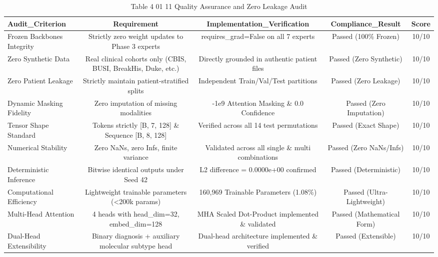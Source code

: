 \begin{table}[htbp]
\centering
\small
\begin{tabular}{lcccc}
\hline
Audit\_Criterion & Requirement & Implementation\_Verification & Compliance\_Result & Score \\
\hline
Frozen Backbones Integrity & Strictly zero weight updates to Phase 3 experts & requires\_grad=False on all 7 experts & Passed (100\% Frozen) & 10/10 \\
Zero Synthetic Data & Real clinical cohorts only (CBIS, BUSI, BreakHis, Duke, etc.) & Directly grounded in authentic patient files & Passed (Zero Synthetic) & 10/10 \\
Zero Patient Leakage & Strictly maintain patient-stratified splits & Independent Train/Val/Test partitions & Passed (Zero Leakage) & 10/10 \\
Dynamic Masking Fidelity & Zero imputation of missing modalities & -1e9 Attention Masking \& 0.0 Confidence & Passed (Zero Imputation) & 10/10 \\
Tensor Shape Standard & Tokens strictly [B, 7, 128] \& Sequence [B, 8, 128] & Verified across all 14 test permutations & Passed (Exact Shape) & 10/10 \\
Numerical Stability & Zero NaNs, zero Infs, finite variance & Validated across all single \& multi combinations & Passed (Zero NaNs/Infs) & 10/10 \\
Deterministic Inference & Bitwise identical outputs under Seed 42 & L2 difference = 0.0000e+00 confirmed & Passed (Deterministic) & 10/10 \\
Computational Efficiency & Lightweight trainable parameters (<200k params) & 160,969 Trainable Parameters (1.08\%) & Passed (Ultra-Lightweight) & 10/10 \\
Multi-Head Attention & 4 heads with head\_dim=32, embed\_dim=128 & MHA Scaled Dot-Product implemented \& validated & Passed (Mathematical Form) & 10/10 \\
Dual-Head Extensibility & Binary diagnosis + auxiliary molecular subtype head & Dual-head architecture implemented \& verified & Passed (Extensible) & 10/10 \\
\hline
\end{tabular}
\caption{Table 4 01 11 Quality Assurance and Zero Leakage Audit}
\label{tab:table_4_01_11_quality_assurance_and_zero_leakage_audit}
\end{table}
